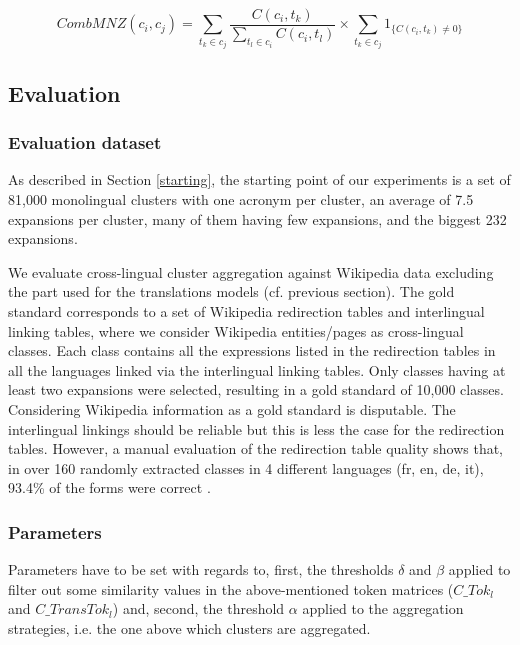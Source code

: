 \documentclass[output=paper]{langsci/langscibook}
\begin{document}
\begin{equation}
CombMNZ(c_i,c_j) = \sum_{t_k\in c_j} \frac{C(c_i,t_k)}{\sum_{t_l\in
    c_i} C(c_i,t_l)} \times \sum_{t_k\in c_j} 1_{\{C(c_i,t_k)\neq0\}}
\end{equation}


\subsection{Evaluation}
\label{evaluation}
\subsubsection{Evaluation dataset}
\label{evalData}

As described in Section \ref{starting}, the starting point of our
experiments is a set of 81,000 monolingual clusters with one acronym
per cluster, an average of 7.5 expansions per cluster, many of them
having few expansions, and the biggest 232 expansions.

We evaluate cross-lingual cluster aggregation against Wikipedia data
excluding the part used for the translations models (cf. previous
section).  The gold standard corresponds to a set of Wikipedia
redirection tables and interlingual linking tables, where we consider
Wikipedia entities/pages as cross-lingual classes.  Each class
contains all the expressions listed in the redirection tables in all
the languages linked via the interlingual linking tables. Only classes
having at least two expansions were selected, resulting in a gold
standard of 10,000 classes.  Considering Wikipedia information as a
gold standard is disputable.  The interlingual linkings should be
reliable but this is less the case for the redirection
tables. However, a manual evaluation of the redirection table quality
shows that, in over 160 randomly extracted classes in 4 different
languages (fr, en, de, it), 93.4\% of the forms were correct
\citep{jacquet-14}.

\subsubsection{Parameters}
\label{settings}

Parameters have to be set with regards to, first, the thresholds
$\delta$ and $\beta$ applied to filter out some similarity values in
the above-mentioned token matrices ($C\_Tok_{l}$ and $C\_TransTok_{l}$) and, second,
the threshold $\alpha$ applied to the aggregation strategies, i.e. the
one above which clusters are aggregated.
\end{document}
